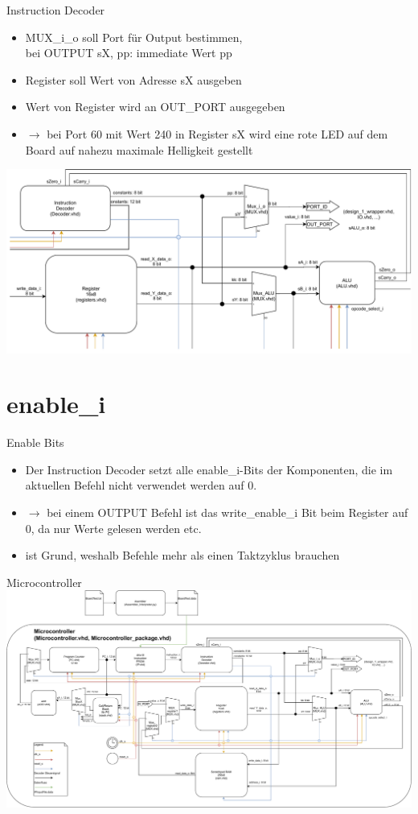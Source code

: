 \documentclass[10pt, t,
aspectratio=169,%
usenames,
dvipsnames,
]{beamer}
\begin{document}
	\begin{frame}{Instruction Decoder}
		\begin{itemize}
			\item MUX\_i\_o soll Port für Output bestimmen, \\ bei OUTPUT sX, pp: immediate Wert pp
			\item Register soll Wert von Adresse sX ausgeben
			\item Wert von Register wird an OUT\_PORT ausgegeben
			\item $\rightarrow$ bei Port 60 mit Wert 240 in Register sX wird eine rote LED auf dem Board auf nahezu maximale Helligkeit gestellt
		\end{itemize}
		\includegraphics[width=.7\linewidth]{../Blockbeschreibungen/IO-BlockdiagramSnipits.pdf}
	\end{frame}
	
	\section{enable\_i}
	
	\begin{frame}{Enable Bits}
		\begin{itemize}
			\item Der Instruction Decoder setzt alle enable\_i-Bits der Komponenten, die im aktuellen Befehl nicht verwendet werden auf 0.
			\item $\rightarrow$ bei einem OUTPUT Befehl ist das write\_enable\_i Bit beim Register auf 0, da nur Werte gelesen werden etc.
			\item ist Grund, weshalb Befehle mehr als einen Taktzyklus brauchen
		\end{itemize}
	\end{frame}

	\begin{frame}{Microcontroller}
		\includegraphics[width=.95\linewidth]{../Blockbeschreibungen/BlockdiagramMitVHDL.pdf}
	\end{frame}
\end{document}
